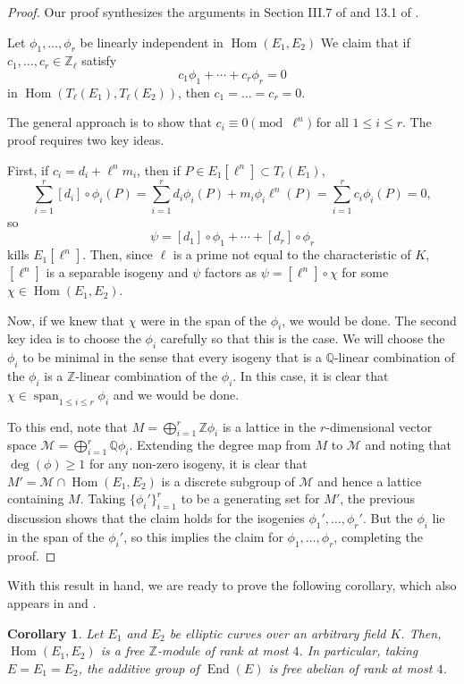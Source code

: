 \documentclass{amsart}
\newtheorem{cor}[thm]{Corollary}
\theoremstyle{definition}
\theoremstyle{remark}
\numberwithin{equation}{section}
\newcommand{\cM}{\mathcal M}
\newcommand{\bbQ}{\mathbb Q}
\newcommand{\bbZ}{\mathbb Z}
\DeclareMathOperator{\End}{End}
\DeclareMathOperator{\Hom}{Hom}
\DeclareMathOperator{\Span}{span}
\begin{document}
\begin{proof}
Our proof synthesizes the arguments in Section III.7 of \cite{SilvermanAEC} and 13.1 of \cite{LangEF}.

Let $\phi_1, \dots, \phi_r$ be linearly independent in $\Hom(E_{1}, E_{2})$ We claim that if $c_{1}, \dots, c_{r} \in \bbZ_{\ell}$ satisfy 
\[ 
c_1 \phi_{1} + \cdots + c_{r} \phi_{r} = 0
\]
in $\Hom(T_{\ell}(E_{1}), T_{\ell}(E_{2}))$, then $c_{1} = \dots = c_{r} = 0$.

The general approach is to show that $c_{i} \equiv 0 \pmod{\ell^n}$ for all $1 \leq i \leq r$. The proof requires two key ideas. 

First, if $c_{i} = d_{i} + \ell^n m_{i}$, then if $P \in E_1[\ell^n] \subset T_{\ell}(E_{1})$,
\[
 \sum_{i=1}^{r} [d_{i}] \circ \phi_{i}(P) = \sum_{i=1}^{r} d_{i} \phi_{i}(P) + m_{i} \phi_{i} \ell^n (P) = \sum_{i=1}^{r} c_{i} \phi_i(P) = 0,
\]
 so
\[
 \psi = [d_{1}] \circ \phi_{1} + \cdots + [d_{r}] \circ \phi_{r}
\]
kills $E_{1}[\ell^n]$. Then, since $\ell$ is a prime not equal to the characteristic of $K$, $[\ell^n]$ is a separable isogeny and $\psi$ factors as $\psi = [\ell^n] \circ \chi$ for some $\chi \in \Hom(E_{1}, E_{2})$.

Now, if we knew that $\chi$ were in the span of the $\phi_{i}$, we would be done. The second key idea is to choose the $\phi_{i}$ carefully so that this is the case. We will choose the $\phi_{i}$ to be minimal in the sense that every isogeny that is a $\bbQ$-linear combination of the $\phi_{i}$ is a $\bbZ$-linear combination of the $\phi_{i}$. In this case, it is clear that $\chi \in \Span_{1 \leq i \leq r} \phi_{i}$ and we would be done.

To this end, note that $M = \bigoplus_{i=1}^{r} \bbZ \phi_{i}$ is a lattice in the $r$-dimensional vector space $\cM =  \bigoplus_{i=1}^{r} \bbQ \phi_{i}$. Extending the degree map from $M$ to $\cM$ and noting that $\deg(\phi) \geq 1$ for any non-zero isogeny, it is clear that $M' = \cM \cap \Hom(E_{1}, E_{2})$ is a discrete subgroup of $\cM$ and hence a lattice containing $M$. Taking $\{\phi_{i}'\}_{i=1}^{r}$ to be a generating set for $M'$, the previous discussion shows that the claim holds for the isogenies $\phi_{1}', \dots, \phi_{r}'$. But the $\phi_{i}$ lie in the span of the $\phi_{i}'$, so this implies the claim for $\phi_{1}, \dots, \phi_{r}$, completing the proof.
\end{proof}


With this result in hand, we are ready to prove the following corollary, which also appears in \cite{SilvermanAEC} and \cite{LangEF}.
\begin{cor} \label{cor:CapSizeOfEndRing}
 Let $E_{1}$ and $E_{2}$ be elliptic curves over an arbitrary field $K$. Then, $\Hom(E_{1}, E_{2})$ is a free $\bbZ$-module of rank at most $4$. In particular, taking $E = E_{1} = E_{2}$, the additive group of $\End(E)$ is free abelian of rank at most $4$.
\end{cor}
\end{document}
